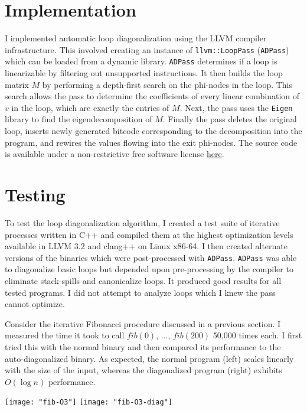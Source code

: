 \documentclass[10pt]{article}
\begin{document}
\section{Implementation}

I implemented automatic loop diagonalization using the LLVM compiler
infrastructure. This involved creating an instance of
\texttt{llvm::LoopPass} (\texttt{ADPass}) which can be loaded from a dynamic
library. \texttt{ADPass} determines if a loop is linearizable by filtering
out unsupported instructions. It then builds the loop matrix $M$ by
performing a depth-first search on the phi-nodes in the loop. This
search allows the pass to determine the coefficients of every linear
combination of $v$ in the loop, which are exactly the entries of $M$. Next,
the pass uses the \texttt{Eigen} library to find the eigendecomposition of
$M$. Finally the pass deletes the original loop, inserts newly generated
bitcode corresponding to the decomposition into the program, and rewires the
values flowing into the exit phi-nodes. The source code is available under a
non-restrictive free software license
\href{https://github.com/vedantk/auto-diagonalize}{here}.

\section{Testing}

To test the loop diagonalization algorithm, I created a test suite of
iterative processes written in C++ and compiled them at the highest
optimization levels available in LLVM 3.2 and clang++ on Linux x86-64. I
then created alternate versions of the binaries which were post-processed
with \texttt{ADPass}. \texttt{ADPass} was able to diagonalize basic loops
but depended upon pre-processing by the compiler to eliminate stack-spills
and canonicalize loops. It produced good results for all tested programs. I
did not attempt to analyze loops which I knew the pass cannot optimize.

Consider the iterative Fibonacci procedure discussed in a previous section.
I measured the time it took to call $fib(0)$, ..., $fib(200)$ 50,000 times
each. I first tried this with the normal binary and then compared its
performance to the auto-diagonalized binary. As expected, the normal program
(left) scales linearly with the size of the input, whereas the diagonalized
program (right) exhibits $O(\log n)$ performance. 

\begin{center}
\texttt{[image: "fib-O3"]}
\texttt{[image: "fib-O3-diag"]}
\end{center}
\end{document}

